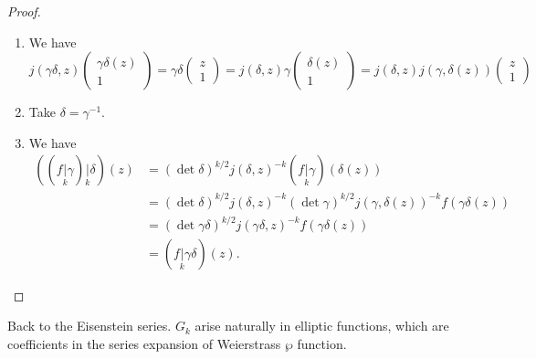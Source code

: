 \documentclass[a4paper]{article}
\begin{document}
\begin{proof}\leavevmode
  \begin{enumerate}
    \item We have
      \[
        j(\gamma\delta, z)
        \begin{pmatrix}
          \gamma\delta(z)\\
          1
        \end{pmatrix} =
        \gamma\delta
        \begin{pmatrix}
          z\\1
        \end{pmatrix}
        =
        j(\delta, z) \gamma
        \begin{pmatrix}
          \delta(z)\\
          1
        \end{pmatrix}
        =
        j(\delta, z) j(\gamma, \delta(z))
        \begin{pmatrix}
          z\\1
        \end{pmatrix}
      \]
    \item Take $\delta = \gamma^{-1}$.
    \item We have
      \begin{align*}
        ((f\underset{k}{|} \gamma) \underset{k}{|} \delta)(z) &= (\det \delta)^{k/2} j(\delta, z)^{-k} (f\underset{k}{|} \gamma) (\delta(z))\\
        &= (\det \delta)^{k/2} j(\delta, z)^{-k} (\det \gamma)^{k/2} j(\gamma, \delta(z))^{-k} f(\gamma\delta(z))\\
        &= (\det \gamma \delta)^{k/2} j(\gamma \delta, z)^{-k} f(\gamma\delta(z))\\
        &= (f\underset{k}{|} \gamma\delta) (z).
      \end{align*}
  \end{enumerate}
\end{proof}
Back to the Eisenstein series. $G_k$ arise naturally in elliptic functions, which are coefficients in the series expansion of Weierstrass $\wp$ function.
\end{document}
